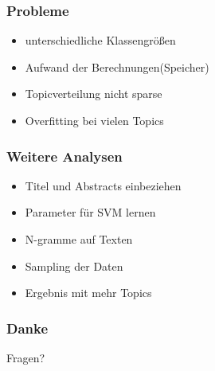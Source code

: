 \documentclass[12pt, xcolor=table]{beamer}
\begin{document}
\begin{frame}
    \frametitle{Probleme}
    \begin{itemize}
        \item unterschiedliche Klassengrößen
        \item Aufwand der Berechnungen(Speicher)
        \item Topicverteilung nicht sparse
        \item Overfitting bei vielen Topics
    \end{itemize}
\end{frame}

\begin{frame}
    \frametitle{Weitere Analysen}
    \begin{itemize}
        \item Titel und Abstracts einbeziehen
        \item Parameter für SVM lernen
        \item N-gramme auf Texten
        \item Sampling der Daten
        \item Ergebnis mit mehr Topics
    \end{itemize}
\end{frame}

\begin{frame}
    \frametitle{Danke}
    \begin{block}{Fragen?}
    \end{block}
\end{frame}
\end{document}
